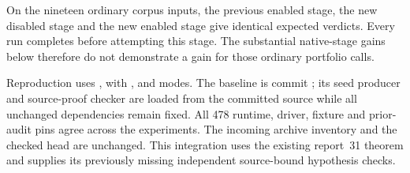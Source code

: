 On the nineteen ordinary corpus inputs, the previous enabled stage, the
new disabled stage and the new enabled stage give identical expected
verdicts. Every run completes before attempting this stage. The substantial
native-stage gains below therefore do not demonstrate a gain for those
ordinary portfolio calls.



Reproduction uses , with
,  and  modes. The baseline is
commit ; its seed producer and source-proof checker are
loaded from the committed source while all unchanged dependencies remain
fixed. All 478 runtime, driver, fixture and prior-audit pins agree across
the experiments. The incoming archive inventory and the checked
 head  are unchanged. This integration
uses the existing report~31 theorem and supplies its previously missing
independent source-bound hypothesis checks.
